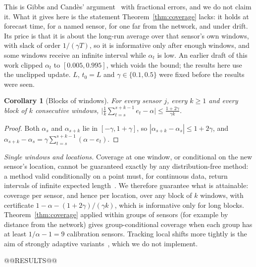\documentclass[journal,twoside,web]{ieeecolor}
\newtheorem{corollary}{Corollary}
\begin{document}
This is Gibbs and Cand\`es' argument~\cite{gibbs2021aci} with fractional errors, and we do not claim it.
What it gives here is the statement Theorem~\ref{thm:coverage} lacks: it holds at forecast time, for a
named sensor, for one far from the network, and under drift. Its price is that it is about the long-run
average over that sensor's own windows, with slack of order $1/(\gamma T)$, so it is informative only
after enough windows, and some windows receive an infinite interval while $\alpha_t$ is low. An earlier
draft of this work clipped $\alpha_t$ to $[0.005,0.995]$, which voids the bound; the results here use the
unclipped update. $L$, $t_0=L$ and $\gamma\in\{0.1,0.5\}$ were fixed before the results were seen.
\begin{corollary}[Blocks of windows]
\label{cor:block}
For every sensor $j$, every $k\ge1$ and every block of $k$ consecutive windows,
$\big|\frac1k\sum_{t=s}^{s+k-1}e_t-\alpha\big|\le\frac{1+2\gamma}{\gamma k}$.
\end{corollary}
\begin{proof}
Both $\alpha_s$ and $\alpha_{s+k}$ lie in $[-\gamma,1+\gamma]$, so $|\alpha_{s+k}-\alpha_s|\le1+2\gamma$, and
$\alpha_{s+k}-\alpha_s=\gamma\sum_{t=s}^{s+k-1}(\alpha-e_t)$. \end{proof}
\emph{Single windows and locations.} Coverage at one window, or conditional on the new sensor's location, cannot
be guaranteed exactly by any distribution-free method: a method valid conditionally on a point must, for
continuous data, return intervals of infinite expected length~\cite{vovk2012conditional,lei2014distribution,barber2021limits}.
We therefore guarantee what is attainable: coverage per sensor, and hence per location, over any block of $k$
windows, with certificate $1-\alpha-(1+2\gamma)/(\gamma k)$, which is informative only for long blocks.
Theorem~\ref{thm:coverage} applied within groups of sensors (for example by distance from the network) gives
group-conditional coverage when each group has at least $1/\alpha-1=9$ calibration sensors. Tracking local
shifts more tightly is the aim of strongly adaptive variants~\cite{gibbs2024dtaci}, which we do not implement.

@@RESULTS@@
\end{document}
